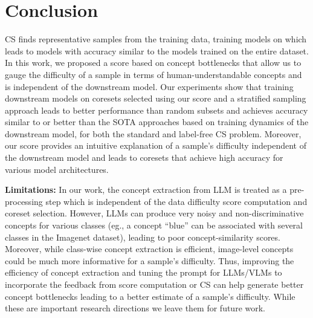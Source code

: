 \section{Conclusion}
\label{sec:conclusion}
CS finds representative samples from the training data, training models on which leads to models with accuracy similar to the models trained on the entire dataset. 
In this work, we proposed a score based on concept bottlenecks that allow us to gauge the difficulty of a sample in terms of human-understandable concepts and is independent of the downstream model. %
Our experiments show that training downstream models on coresets selected using our score and a stratified sampling approach leads to better performance than random subsets and achieves accuracy similar to or better than the SOTA approaches based on training dynamics of the downstream model, for both the standard and label-free CS problem. 
Moreover, our score provides an intuitive explanation of a sample's difficulty independent of the downstream model and leads to coresets that achieve high accuracy for various model architectures.

{\bf Limitations:}
In our work, the concept extraction from LLM is treated as a pre-processing step which is independent of the data difficulty score computation and coreset selection. 
However, LLMs can produce very noisy and non-discriminative concepts for various classes (eg., a concept ``blue'' can be associated with several classes in the Imagenet dataset), leading to poor concept-similarity scores. 
Moreover, while class-wise concept extraction is efficient, image-level concepts could be much more informative for a sample's difficulty. 
Thus, improving the efficiency of concept extraction and tuning the prompt for LLMs/VLMs to incorporate the feedback from score computation or CS can help generate better concept bottlenecks leading to a better estimate of a sample's difficulty.
While these are important research directions we leave them for future work.


